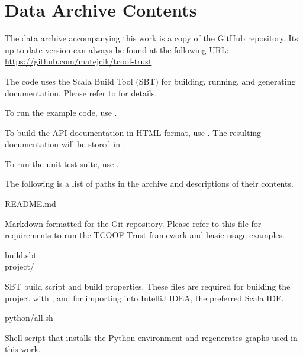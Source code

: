 \chapter{Data Archive Contents}
\label{appendix}

The data archive accompanying this work is a copy of the  GitHub
repository. Its up-to-date version can always be found at the following URL:
\href{https://github.com/matejcik/tcoof-trust}{\ttfamily https://github.com/matejcik/tcoof-trust}

The code uses the Scala Build Tool (SBT) for building, running, and generating
documentation. Please refer to  for details.

To run the example code, use .

To build the API documentation in HTML format, use . The resulting
documentation will be stored in .

To run the unit test suite, use .

\medskip

The following is a list of paths in the archive and descriptions of their contents.

\newenvironment{filepath}%
    {%
        \par\vspace{0.6em}\ttfamily\raggedright
    }%
    {%
        \vspace{-0.2em}
    }%

\begin{filepath}
README.md
\end{filepath}
\begin{dsldesc}
    Markdown-formatted  for the Git repository. Please refer to this file for
    requirements to run the TCOOF-Trust framework and basic usage examples.
\end{dsldesc}

\begin{filepath}
build.sbt\\
project/
\end{filepath}
\begin{dsldesc}
    SBT build script and build properties. These files are required for building the
    project with , and for importing into IntelliJ IDEA, the preferred Scala
    IDE.
\end{dsldesc}

\begin{filepath}
python/all.sh
\end{filepath}
\begin{dsldesc}
    Shell script that installs the Python environment and regenerates graphs used in
    this work.
\end{dsldesc}

